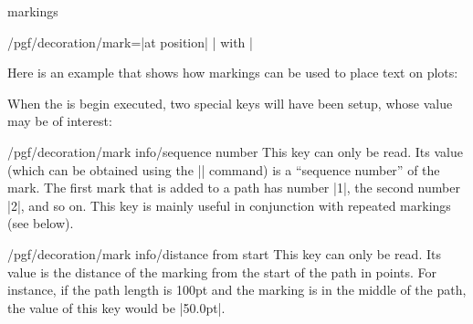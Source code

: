 \begin{decoration}{markings}
\begin{key}{/pgf/decoration/mark=|at position|
      | with |}
\begin{codeexample}[]
\end{codeexample}  

    Here is an example that shows how markings can be used to place text
    on plots:
\begin{codeexample}[]
\end{codeexample}

    When the  is begin executed, two special keys will have
    been setup, whose value may be of interest:
    \begin{key}{/pgf/decoration/mark info/sequence number}
      This key can only be read. Its value (which can be obtained
      using the |\pgfkeysvalueof| command) is a ``sequence number'' of
      the mark. The first mark that is added to a path has number |1|,
      the second number |2|, and so on. This key is mainly useful in
      conjunction with repeated markings (see below).
    \end{key}
    \begin{key}{/pgf/decoration/mark info/distance from start}
      This key can only be read. Its value is the distance of the
      marking from the start of the path in points. For instance, if
      the path length is 100pt and the marking is in the middle of the
      path, the value of this key would be |50.0pt|.
    \end{key}
  \end{key}


\end{decoration}
